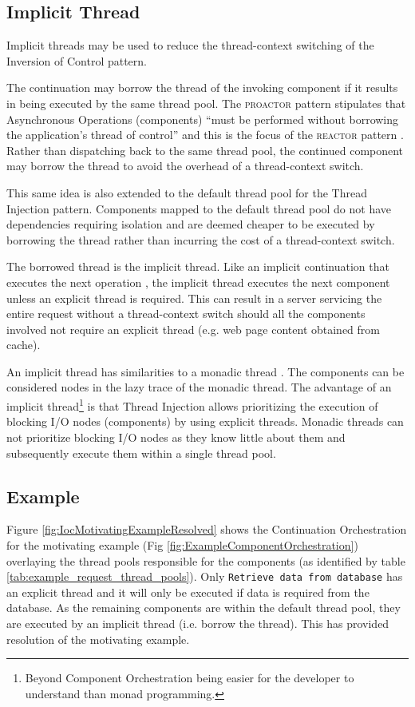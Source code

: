 \documentclass[prodmode]{style/acmlarge}
\begin{document}
\subsection{Implicit Thread}

Implicit threads may be used to reduce the thread-context switching of the
Inversion of Control pattern.

The continuation may borrow the thread of the invoking component if it results
in being executed by the same thread pool.  The \textsc{proactor} pattern
stipulates that Asynchronous Operations (components) ``must be performed without
borrowing the application's thread of control'' \cite[p. 8]{proactor} and this
is the focus of the \textsc{reactor} pattern \cite{reactor}.  Rather than
dispatching back to the same thread pool, the continued component may borrow the
thread to avoid the overhead of a thread-context switch.

This same idea is also extended to the default thread pool for the Thread
Injection pattern.  Components mapped to the default thread pool do
not have dependencies requiring isolation and are deemed cheaper to be executed
by borrowing the thread rather than incurring the cost of a thread-context
switch.

The borrowed thread is the implicit thread.  Like an implicit continuation that
executes the next operation \cite{continuations}, the implicit thread executes
the next component unless an explicit thread is required.  This can result in
a server servicing the entire request without a thread-context switch
should all the components involved not require an explicit thread
(e.g. web page content obtained from cache).

An implicit thread has similarities to a monadic thread \cite{monadic-thread}.
The components can be considered nodes in the lazy trace of the monadic thread. 
The advantage of an implicit thread\footnote{Beyond Component Orchestration
being easier for the developer to understand than monad programming.} is that
Thread Injection allows prioritizing the execution of blocking I/O nodes
(components) by using explicit threads.  Monadic threads can not prioritize
blocking I/O nodes as they know little about them and subsequently execute them
within a single thread pool.


\subsection{Example}

Figure \ref{fig:IocMotivatingExampleResolved} shows the Continuation
Orchestration for the motivating example (Fig
\ref{fig:ExampleComponentOrchestration}) overlaying the thread pools responsible
for the components (as identified by table
\ref{tab:example_request_thread_pools}).  Only \texttt{Retrieve data from
database} has an explicit thread and it will only be executed if data is
required from the database.  As the remaining components are within the default
thread pool, they are executed by an implicit thread (i.e. borrow the thread). 
This has provided resolution of the motivating example.
\end{document}
